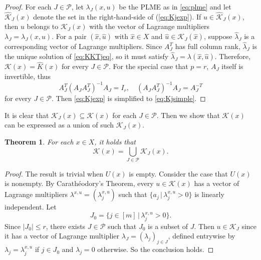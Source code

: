 \documentclass{amsart}
\newcommand{\reff}[1]{(\ref{#1})}
\newtheorem{theorem}{Theorem}[section]
\theoremstyle{plain}
\newcommand{\mc}[1]{\mathcal{#1}}
\numberwithin{equation}{section}
\begin{document}
	\begin{proof}
		For each $J\in \mc{P}$, let $\lambda_J(x,u)$ be the PLME as in \eqref{eq:plme}
		and let $\hat{\mc{K}}_J(x)$ denote the set in the right-hand-side of \reff{eq:Kjexp}.
		If $u\in \hat{\mc{K}}_J(x)$, then $u$ belongs to $\mc{K}_J(x)$ with 
		the vector of Lagrange multipliers $\lambda_J = \lambda_J(x,u)$.
		For a pair $(\hat{x}, \hat{u})$ with $\hat{x}\in X$ and $\hat{u}\in \mc{K}_J(\hat{x})$, 
        suppose $\hat{\lambda}_J$ is a corresponding vector of Lagrange multipliers.
		Since $A_J^T$ has full column rank, $\hat{\lambda}_J$ is the unique solution of 
        \eqref{eq:KKTjeq}, so it must satisfy $\hat{\lambda}_J = \lambda(\hat{x}, \hat{u})$.
		Therefore, $\mc{K}(x)=\hat{K}(x)$ for every $J\in\mc{P}$.
		For the special case that $p=r$, $A_J$ itself is invertible, thus
		\[ A_J^T(A_JA_J^T)^{-1}A_J = I_r,\quad (A_JA_J^T)^{-1}A_J = A_J^{-T}\]
		for every $J\in\mc{P}$. 
		Then \eqref{eq:Kjexp} is simplified to \eqref{eq:Kjsimple}.
	\end{proof}
	

	
	
	
		It is clear that $\mc{K}_J(x) \subseteq \mc{K}(x)$ for each $J\in\mc{P}$.
		Then we show that $\mc{K}(x)$ can be expressed as a union of such $\mc{K}_{J}(x)$.
		\begin{theorem}\label{thm:kktdcp}
			For each $x\in X$, it holds that
			\begin{equation}\label{K_union_KJ}
				\mc{K}(x) = \bigcup\limits_{J\in \mc{P}}\mathcal{K}_{J}(x).
			\end{equation}
		\end{theorem}
		\begin{proof}
			The result is trivial when $U(x)$ is empty.
			Consider the case that $U(x)$ is nonempty.
			By Carath\'{e}odory’s Theorem, every $u\in \mc{K}(x)$ has a vector of Lagrange multipliers 
			$\lambda^{x,u} = (\lambda_j^{x,u})$ such that $\{a_j\,\vert\, \lambda_j^{x,u}>0\}$ is linearly independent. Let
			\[ J_0 = \{ j\in [m]\,\vert\, \lambda_j^{x,u}>0 \}. \]
			Since $|J_0|\le r$, there exists $J\in \mc{P}$ such that
			$J_0$ is a subset of $J$. Then $u\in \mc{K}_J$ since it has a vector
			of Lagrange multiplier $\lambda_J= (\lambda_j)_{j\in J}$, defined entrywise by
			$\lambda_j = \lambda_j^{x,u}$ if $j\in J_0$ and $\lambda_j = 0$ otherwise.
			So the conclusion holds.
		\end{proof}
		
\end{document}
